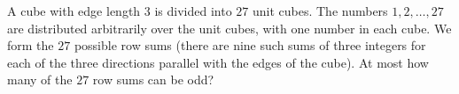 A cube with edge length $3$ is divided into $27$ unit cubes. The numbers $1, 2,\ldots ,27$ are distributed arbitrarily over the unit cubes, with one number in each cube. We form the $27$ possible row sums (there are nine such sums of three integers for each of the three directions parallel with the edges of the cube). At most how many of the $27$ row sums can be odd?